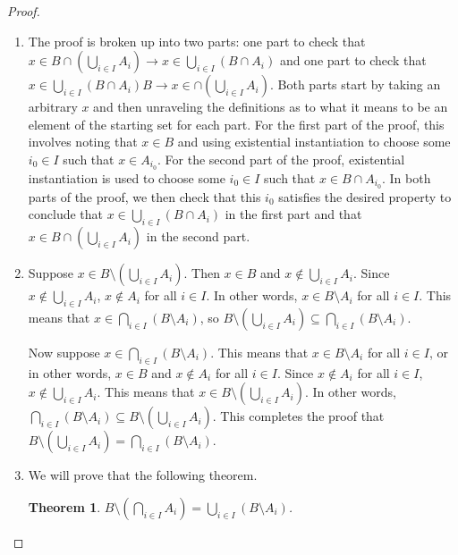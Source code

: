 \documentclass[12pt]{amsart}
\newtheorem{theorem}{Theorem}
\theoremstyle{definition}
\theoremstyle{remark}
\begin{document}
\begin{proof}
\hfill
\begin{enumerate}
	\item The proof is broken up into two parts: one part to check that
	$x \in B \cap \left( \bigcup_{i \in I} A_i \right) \rightarrow x \in  \bigcup_{i \in I} (B \cap A_i)$
	and one part to check that 
	$x \in \bigcup_{i \in I} (B \cap A_i) B \rightarrow x \in \cap \left( \bigcup_{i \in I} A_i \right)$.
	Both parts start by taking an arbitrary $x$ and then unraveling the definitions as to what
	it means to be an element of the starting set for each part.
	For the first part of the proof, this involves noting that $x \in B$ and using existential instantiation
	to choose some $i_0 \in I$ such that $x \in A_{i_0}$.
	For the second part of the proof, existential instantiation is used to choose some $i_0 \in I$
	such that $x \in B \cap A_{i_0}$.
	In both parts of the proof, we then check that this $i_0$ satisfies the desired property
	to conclude that $x \in \bigcup_{i \in I} (B \cap A_i)$ in the first part and that
	$x \in B \cap \left( \bigcup_{i \in I} A_i \right)$ in the second part.
	
	\item Suppose $x \in B \setminus \left( \bigcup_{i \in I} A_i \right)$.
	Then $x \in B$ and $x \notin \bigcup_{i \in I} A_i$.
	Since $x \notin \bigcup_{i \in I} A_i$, $x \notin A_i$ for all $i \in I$.
	In other words, $x \in B \setminus A_i$ for all $i \in I$.
	This means that $x \in \bigcap_{i \in I} (B \setminus A_i)$, so 
	$B \setminus \left( \bigcup_{i \in I} A_i \right) \subseteq \bigcap_{i \in I} (B \setminus A_i)$.
	
	Now suppose $x \in \bigcap_{i \in I} (B \setminus A_i)$.
	This means that $x \in B \setminus A_i$ for all $i \in I$, or in other words, $x \in B$
	and $x \notin A_i$ for all $i \in I$.
	Since $x \notin A_i$ for all $i \in I$, $x \notin \bigcup_{i \in I} A_i$.
	This means that $x \in B \setminus \left( \bigcup_{i \in I} A_i \right)$.
	In other words, 
	$\bigcap_{i \in I} (B \setminus A_i) \subseteq B \setminus \left( \bigcup_{i \in I} A_i \right)$.
	This completes the proof that $B \setminus \left( \bigcup_{i \in I} A_i \right) = 
	\bigcap_{i \in I} (B \setminus A_i)$.
	
	\item We will prove that the following theorem.
	\begin{theorem}
		$B \setminus \left( \bigcap_{i \in I} A_i \right) = 
		\bigcup_{i \in I} (B \setminus A_i)$.
	\end{theorem}
	

\end{enumerate}
\end{proof}
\end{document}
